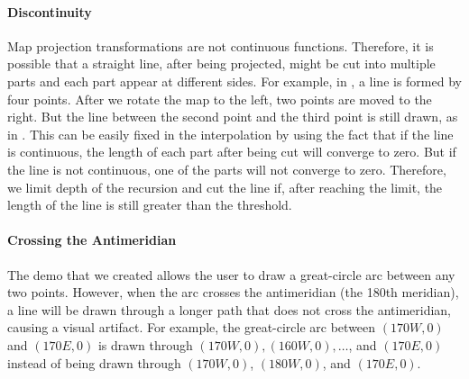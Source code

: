 \paragraph{Discontinuity}

Map projection transformations are not continuous functions. Therefore, it is possible that a straight line, after being projected, might be cut into multiple parts and each part appear at different sides. For example, in , a line is formed by four points. After we rotate the map to the left, two points are moved to the right. But the line between the second point and the third point is still drawn, as in . This can be easily fixed in the interpolation by using the fact that if the line is continuous, the length of each part after being cut will converge to zero. But if the line is not continuous, one of the parts will not converge to zero. Therefore, we limit depth of the recursion and cut the line if, after reaching the limit, the length of the line is still greater than the threshold.




\paragraph{Crossing the Antimeridian}


The demo that we created allows the user to draw a great-circle arc between any two points. However, when the arc crosses the antimeridian (the 180th meridian), a line will be drawn through a longer path that does not cross the antimeridian, causing a visual artifact. For example, the great-circle arc between $(170W, 0)$ and $(170E, 0)$ is drawn through  $(170W, 0), (160W, 0), \dots$, and $(170E, 0)$ instead of being drawn through $(170W, 0)$, $(180W, 0)$, and $(170E, 0)$.




